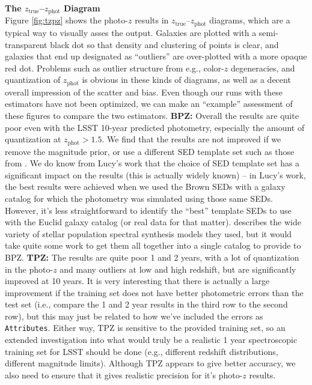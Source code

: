 \documentclass[DM,lsstdraft,toc]{lsstdoc}
\begin{document}
\smallskip \noindent \textbf{The $z_\mathrm{true}$--$z_\mathrm{phot}$ Diagram} \\
Figure \ref{fig:tzpz} shows the photo-$z$ results in $z_\mathrm{true}$--$z_\mathrm{phot}$ diagrams, which are a typical way to visually asses the output. Galaxies are plotted with a semi-transparent black dot so that density and clustering of points is clear, and galaxies that end up designated as ``outliers'' are over-plotted with a more opaque red dot. Problems such as outlier structure from e.g., color-$z$ degeneracies, and quantization of $z_\mathrm{phot}$ is obvious in these kinds of diagrams, as well as a decent overall impression of the scatter and bias. Even though our runs with these estimators have not been optimized, we can make an ``example'' assessment of these figures to compare the two estimators.
\textbf{BPZ:} Overall the results are quite poor even with the LSST 10-year predicted photometry, especially the amount of quantization at $z_\mathrm{phot}>1.5$. We find that the results are not improved if we remove the magnitude prior, or use a different SED template set such as those from \cite{2014ApJS..212...18B}. We do know from Lucy's work that the choice of SED template set has a significant impact on the results (this is actually widely known) -- in Lucy's work, the best results were achieved when we used the Brown SEDs with a galaxy catalog for which the photometry was simulated using those same SEDs. However, it's less straightforward to identify the ``best'' template SEDs to use with the Euclid galaxy catalog (or real data for that matter). \cite{2014MNRAS.439..264G} describes the wide variety of stellar population spectral synthesis models they used, but it would take quite some work to get them all together into a single catalog to provide to BPZ.
\textbf{TPZ:} The results are quite poor 1 and 2 years, with a lot of quantization in the photo-$z$ and many outliers at low and high redshift, but are significantly improved at 10 years. It is very interesting that there is actually a large improvement if the training set does not have better photometric errors than the test set (i.e., compare the 1 and 2 year results in the third row to the second row), but this may just be related to how we've included the errors as \texttt{Attributes}. Either way, TPZ is sensitive to the provided training set, so an extended investigation into what would truly be a realistic 1 year spectroscopic training set for LSST should be done (e.g., different redshift distributions, different magnitude limits). Although TPZ appears to give better accuracy, we also need to ensure that it gives realistic precision for it's photo-$z$ results.
\end{document}
